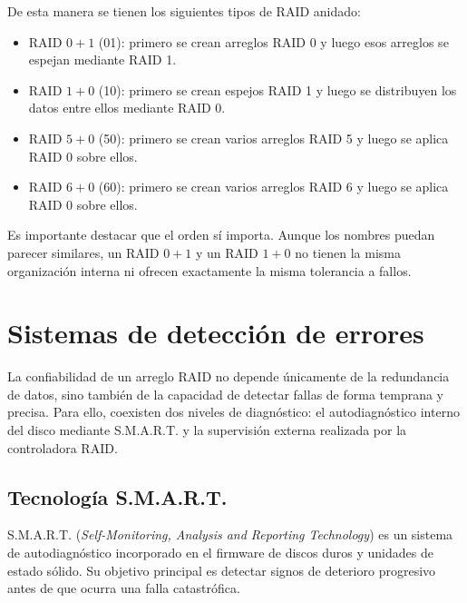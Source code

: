 De esta manera se tienen los siguientes tipos de RAID anidado:
\begin{itemize}
  \item RAID \(0+1\) (01): primero se crean arreglos RAID 0 y luego esos arreglos se espejan mediante RAID 1.
  \item RAID \(1+0\) (10): primero se crean espejos RAID 1 y luego se distribuyen los datos entre ellos mediante RAID 0.
  \item RAID \(5+0\) (50): primero se crean varios arreglos RAID 5 y luego se aplica RAID 0 sobre ellos.
  \item RAID \(6+0\) (60): primero se crean varios arreglos RAID 6 y luego se aplica RAID 0 sobre ellos.
\end{itemize}
Es importante destacar que el orden sí importa. Aunque los nombres puedan parecer similares, un RAID \(0+1\) y un RAID \(1+0\) no tienen la misma organización interna ni ofrecen exactamente la misma tolerancia a fallos.









\section{Sistemas de detección de errores}

La confiabilidad de un arreglo RAID no depende únicamente de la redundancia de datos, sino también de la capacidad de detectar fallas de forma temprana y precisa. Para ello, coexisten dos niveles de diagnóstico: el autodiagnóstico interno del disco mediante S.M.A.R.T. y la supervisión externa realizada por la controladora RAID.

\subsection{Tecnología S.M.A.R.T.}

S.M.A.R.T. (\textit{Self-Monitoring, Analysis and Reporting Technology}) es un sistema de autodiagnóstico incorporado en el firmware de discos duros y unidades de estado sólido. Su objetivo principal es detectar signos de deterioro progresivo antes de que ocurra una falla catastrófica.

